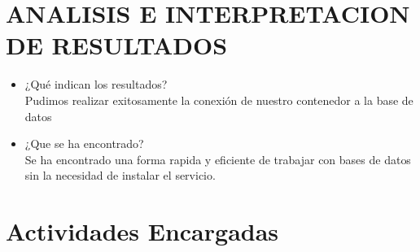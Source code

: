 \documentclass[preprint,12pt]{elsarticle}
\begin{document}
\section{ANALISIS E INTERPRETACION DE RESULTADOS }
\begin{itemize}
	\item ¿Qué indican los resultados? \\
	Pudimos realizar exitosamente la conexión de nuestro contenedor a la base de datos
	\item ¿Que se ha encontrado?\\
	Se ha encontrado una forma rapida y eficiente de trabajar con bases de datos sin la necesidad de instalar el servicio.
\end{itemize}

\section{Actividades Encargadas}
\end{document}
